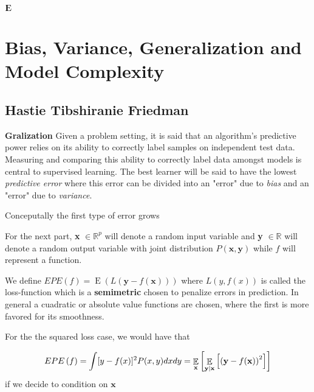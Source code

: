 $\newcommand{\Expect}{{\rm I\kern-.3em E}}$

$\Expect$

\section{Bias, Variance, Generalization and Model Complexity}

\subsection{Hastie Tibshiranie Friedman}

\textbf{Gralization}
Given a problem setting, it is said that an algorithm's predictive power relies on its ability to correctly label samples on independent test data. Measuring and comparing this ability to correctly label data amongst models is central to supervised learning.  The best learner will be said to have the lowest \textit{predictive error} where this error can be divided into an "error" due to \textit{bias} and an "error" due to \textit{variance}.

Conceputally the first type of error grows 



For the next part, \textbf{x} $\in \mathbb{R}^{p}$ will denote a random input variable and \textbf{y}  $\in \mathbb{R}$ will denote a random output variable with joint distribution $P\left(\textbf{x},\textbf{y}\right)$ while $f$ will represent a function. 

We define $EPE\left(f \right) = \mathop{E}\left(L\left(\textbf{y} - f(\textbf{x}) \right) \right)  $ where $L(y,f\left(x\right))$ is called the loss-function which is a \textbf{semimetric} chosen to penalize errors in prediction. In general a cuadratic or absolute value functions are chosen, where the first is more favored for its smoothness. 

For the the squared loss case, we would have that  

\begin{equation} \label{eq:expectedError}
EPE\left(f \right) = \int [y - f(x)]^2 P(x,y)dxdy

\\
= \mathop{\mathbb{E}}_{\textbf{x}} \left[ \mathop{\mathbb{E}}_{\textbf{y}|\textbf{x}} \left[  \left( \textbf{y} - f(\textbf{x})  \right)^2 \right]  \right]

\end{equation}
if we decide to condition on $\textbf{x}$

